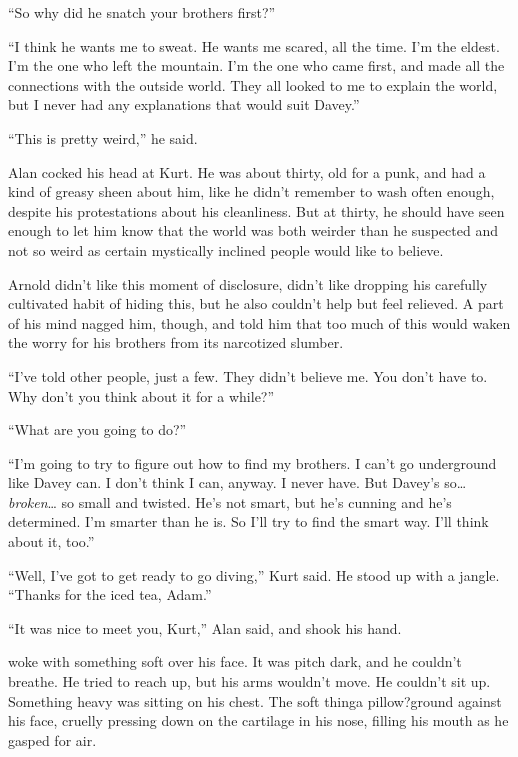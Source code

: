 ``So why did he snatch your brothers first?''

``I think he wants me to sweat.  He wants me scared, all the time. 
I'm the eldest.  I'm the one who left the mountain.  I'm the one who
came first, and made all the connections with the outside world.  They
all looked to me to explain the world, but I never had any
explanations that would suit Davey.''

``This is pretty weird,'' he said.

Alan cocked his head at Kurt.  He was about thirty, old for a punk,
and had a kind of greasy sheen about him, like he didn't remember to
wash often enough, despite his protestations about his cleanliness. 
But at thirty, he should have seen enough to let him know that the
world was both weirder than he suspected and not so weird as certain
mystically inclined people would like to believe.

Arnold didn't like this moment of disclosure, didn't like dropping his
carefully cultivated habit of hiding this, but he also couldn't help
but feel relieved.  A part of his mind nagged him, though, and told
him that too much of this would waken the worry for his brothers from
its narcotized slumber.

``I've told other people, just a few.  They didn't believe me.  You
don't have to.  Why don't you think about it for a while?''

``What are you going to do?''

``I'm going to try to figure out how to find my brothers.  I can't go
underground like Davey can.  I don't think I can, anyway.  I never
have.  But Davey's so\ldots{}  \textit{broken}\ldots{}  so small and twisted. 
He's not smart, but he's cunning and he's determined.  I'm smarter
than he is.  So I'll try to find the smart way.  I'll think about it,
too.''

``Well, I've got to get ready to go diving,'' Kurt said.  He stood up
with a jangle.  ``Thanks for the iced tea, Adam.''

``It was nice to meet you, Kurt,'' Alan said, and shook his hand.

 woke with something soft over his face.  It was pitch dark, and
he couldn't breathe.  He tried to reach up, but his arms wouldn't
move.  He couldn't sit up.  Something heavy was sitting on his chest. 
The soft thing\dash{}a pillow?\dash{}ground against his face, cruelly pressing
down on the cartilage in his nose, filling his mouth as he gasped for
air.

